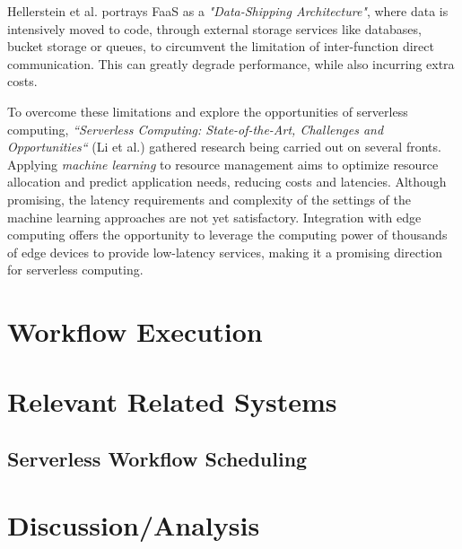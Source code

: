 Hellerstein et al. \cite{serverless_computing_drawbacks_survey_rw1} portrays FaaS as a \textit{"Data-Shipping Architecture"}, where data is intensively moved to code, through external storage services like databases, bucket storage or queues, to circumvent the limitation of inter-function direct communication. This can greatly degrade performance, while also incurring extra costs.

To overcome these limitations and explore the opportunities of serverless computing, \textit{``Serverless Computing: State-of-the-Art, Challenges and Opportunities``} (Li et al.) gathered research being carried out on several fronts. Applying \textit{machine learning} to resource management aims to optimize resource allocation and predict application needs, reducing costs and latencies. Although promising, the latency requirements and complexity of the settings of the machine learning approaches are not yet satisfactory. Integration with edge computing offers the opportunity to leverage the computing power of thousands of edge devices to provide low-latency services, making it a promising direction for serverless computing.

\section{Workflow Execution}

\section{Relevant Related Systems}

\subsection{Serverless Workflow Scheduling}

\section{Discussion/Analysis}
